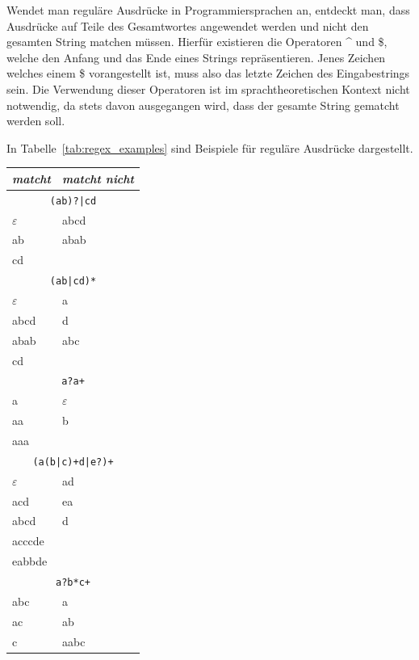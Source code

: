 Wendet man reguläre Ausdrücke in Programmiersprachen an, entdeckt man, dass Ausdrücke auf Teile des Gesamtwortes angewendet werden und nicht den gesamten String matchen müssen. Hierfür existieren die Operatoren \^{} und \$, welche den Anfang und das Ende eines Strings repräsentieren. Jenes Zeichen welches einem \$ vorangestellt ist, muss also das letzte Zeichen des Eingabestrings sein. Die Verwendung dieser Operatoren ist im sprachtheoretischen Kontext nicht notwendig, da stets davon ausgegangen wird, dass der gesamte String gematcht werden soll.

In Tabelle~\ref{tab:regex_examples} sind Beispiele für reguläre Ausdrücke dargestellt.
%
\begin{table}[p]
 \begin{center}
  \begin{tabular}{ll}
    \hline \hline
      \emph{matcht} & \emph{matcht nicht} \\
    \hline \hline
      \multicolumn{2}{c}{\texttt{(ab)?|cd}} \\
    \hline
      $\varepsilon$ & abcd \\
      ab & abab \\
      cd & \\
    \hline
      \multicolumn{2}{c}{\texttt{(ab|cd)*}} \\
    \hline
      $\varepsilon$ & a \\
      abcd & d \\
      abab & abc \\
      cd & \\
    \hline
      \multicolumn{2}{c}{\texttt{a?a+}} \\
    \hline
      a & $\varepsilon$ \\
      aa & b \\
      aaa & \\
    \hline
      \multicolumn{2}{c}{\texttt{(a(b|c)+d|e?)+}} \\
    \hline
      $\varepsilon$ & ad \\
      acd & ea \\
      abcd & d \\
      acccde & \\
      eabbde & \\
    \hline
      \multicolumn{2}{c}{\texttt{a?b*c+}} \\
    \hline
      abc & a \\
      ac & ab \\
      c & aabc \\

\end{tabular}
\end{center}
\end{table}
